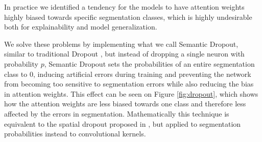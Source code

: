 In practice we identified a tendency for the models to have attention
weights highly biased towards specific segmentation classes, which is highly undesirable
both for explainability and model generalization.

We solve these problems by implementing what we call Semantic Dropout, similar to traditional Dropout \cite{srivastava_dropout},
but instead of dropping a single neuron with probability $p$, Semantic Dropout sets the
probabilities of an entire segmentation class to 0, inducing artificial errors
during training and preventing the network from becoming too sensitive to
segmentation errors while also reducing the bias in attention weights.
This effect can be seen on Figure \ref{fig:dropout}, which shows how the attention weights are less biased towards one class and therefore
less affected by the errors in segmentation.
Mathematically
this technique is equivalent to the spatial dropout proposed in ,
but applied to segmentation probabilities instead to convolutional kernels.


